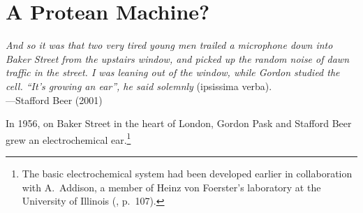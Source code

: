 



\section{A Protean Machine?}

\begin{changemargin}{4em}{4em} 

\vspace{1em}

\textit{And so it was that two very tired young men trailed a microphone down into Baker Street from the upstairs window, and picked up the random noise of dawn traffic in the street. 
I was leaning out of the window, while Gordon studied the cell. 
``It's growing an ear'', he said solemnly} (ipsissima verba). \\[1em]
\hspace*{16.5em} ---Stafford Beer (2001)

\vspace{1em}

\end{changemargin}



\noindent
In 1956, on Baker Street in the heart of London,
Gordon Pask and Stafford Beer grew an electrochemical ear.\footnote{%
The basic electrochemical system had been developed earlier in collaboration with A.~Addison,
a member of Heinz von Foerster's laboratory at the University of Illinois
(\cite{pask1961approach}, p.~107).
}



